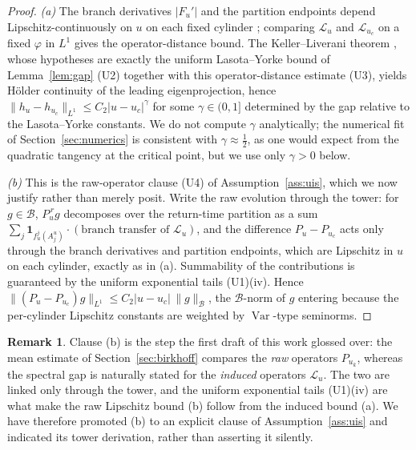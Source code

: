 \documentclass[11pt,a4paper]{article}
\theoremstyle{definition}
\newtheorem{remark}[theorem]{Remark}
\begin{document}
\begin{proof}
\emph{(a)} The branch derivatives $|F_u'|$ and the partition endpoints
depend Lipschitz-continuously on $u$ on each fixed cylinder
\cite[Ch.\ V]{demelo1993one}; comparing $\mathcal{L}_u$ and
$\mathcal{L}_{u_c}$ on a fixed $\varphi$ in $L^1$ gives the
operator-distance bound. The Keller--Liverani theorem
\cite[Thm.\ 1]{kellerliverani1999}, whose hypotheses are exactly the
uniform Lasota--Yorke bound of Lemma~\ref{lem:gap} (U2) together with
this operator-distance estimate (U3), yields Hölder continuity of the
leading eigenprojection, hence
$\|h_u - h_{u_c}\|_{L^1} \leq C_2 |u-u_c|^{\gamma}$ for some
$\gamma\in(0,1]$ determined by the gap relative to the Lasota--Yorke
constants. We do not compute $\gamma$ analytically; the numerical fit
of Section~\ref{sec:numerics} is consistent with $\gamma\approx\tfrac12$,
as one would expect from the quadratic tangency at the critical point,
but we use only $\gamma>0$ below.

\emph{(b)} This is the raw-operator clause (U4) of
Assumption~\ref{ass:uis}, which we now justify rather than merely posit.
Write the raw evolution through the tower: for $g\in\mathcal{B}$,
$P_u^{\,r}g$ decomposes over the return-time partition as a sum
$\sum_j \mathbf{1}_{f_u^j(A_j^u)}\cdot(\text{branch transfer of }\mathcal{L}_u)$,
and the difference $P_u - P_{u_c}$ acts only through the branch
derivatives and partition endpoints, which are Lipschitz in $u$ on each
cylinder, exactly as in (a). Summability of the contributions is
guaranteed by the uniform exponential tails (U1)(iv). Hence
$\|(P_u-P_{u_c})g\|_{L^1}\le C_2|u-u_c|\,\|g\|_{\mathcal{B}}$, the
$\mathcal{B}$-norm of $g$ entering because the per-cylinder Lipschitz
constants are weighted by $\operatorname{Var}$-type seminorms.
\end{proof}

\begin{remark}
Clause (b) is the step the first draft of this work glossed over: the
mean estimate of Section~\ref{sec:birkhoff} compares the \emph{raw}
operators $P_{u_k}$, whereas the spectral gap is naturally stated for
the \emph{induced} operators $\mathcal{L}_u$. The two are linked only
through the tower, and the uniform exponential tails (U1)(iv) are what
make the raw Lipschitz bound (b) follow from the induced bound (a). We
have therefore promoted (b) to an explicit clause of
Assumption~\ref{ass:uis} and indicated its tower derivation, rather
than asserting it silently.
\end{remark}
\end{document}
